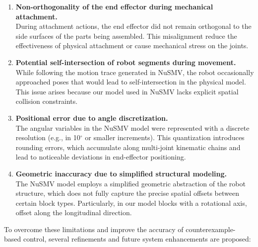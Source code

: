 \begin{enumerate}
    \item \textbf{Non-orthogonality of the end effector during mechanical attachment.}\\
    During attachment actions, the end effector did not remain 
    orthogonal to the side surfaces of the parts being assembled. 
    This misalignment  reduce the effectiveness of physical attachment or 
    cause mechanical stress on the joints.
    
    \item \textbf{Potential self-intersection of robot segments during movement.}\\
    While following the motion trace generated in NuSMV, the robot occasionally 
    approached poses that would lead to self-intersection in 
    the physical model. 
    This issue arises because our model used in NuSMV lacks explicit 
    spatial collision constraints.
    
    \item \textbf{Positional error due to angle discretization.}\\
    The angular variables in the NuSMV model were represented with a 
    discrete resolution (e.g., in 10$^\circ$ or smaller increments). 
    This quantization introduces rounding errors, which accumulate along 
    multi-joint kinematic chains and lead to noticeable deviations in end-effector positioning.
    
    \item \textbf{Geometric inaccuracy due to simplified structural modeling.}\\
    The NuSMV model employs a simplified geometric abstraction of the robot
    structure, which does not fully capture the precise spatial offsets 
    between certain block types.
    Particularly, in our model blocks with a rotational axis, offset along the longitudinal direction. 
\end{enumerate}

To overcome these limitations and improve the accuracy of counterexample-
based control, several refinements and future system enhancements
are proposed:

